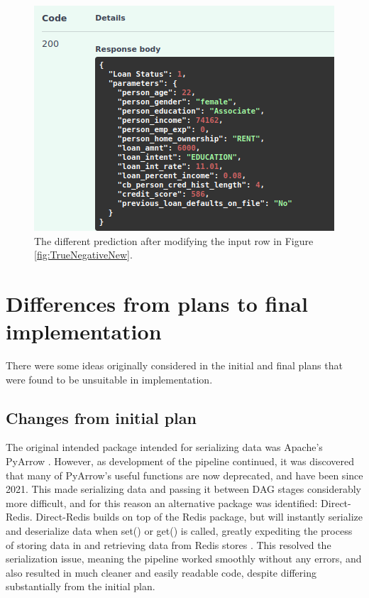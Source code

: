 \documentclass[12pt]{report}
\begin{document}
\begin{figure}[H]
    \centering
    \includegraphics[width=.75\linewidth]{Implementation/JAN 10 UPDATES/UviCustomRow.png}
    \caption{The different prediction after modifying the input row in Figure \ref{fig:TrueNegativeNew}.}
    \label{fig:UviCustomRow}
\end{figure}

\section{Differences from plans to final implementation}
There were some ideas originally considered in the initial and final plans that were found to be unsuitable in implementation.

\subsection{Changes from initial plan}
The original intended package intended for serializing data was Apache's
PyArrow \autocite{apache_streaming_nodate}. However, as development of the pipeline continued, it was discovered that many of PyArrow's
useful functions are now deprecated, and have been since 2021. This made serializing data
and passing it between DAG stages considerably more difficult, and for this reason an alternative
package was identified: Direct-Redis. Direct-Redis builds on top of the Redis package,
but will instantly serialize and deserialize data when set() or get() is called, greatly expediting
the process of storing data in and retrieving data from Redis stores \autocite{direct-redis_direct-redis_nodate}. 
This resolved the serialization issue, meaning the pipeline worked smoothly without
any errors, and also resulted in much cleaner and easily readable code, despite differing 
substantially from the initial plan.
\end{document}

